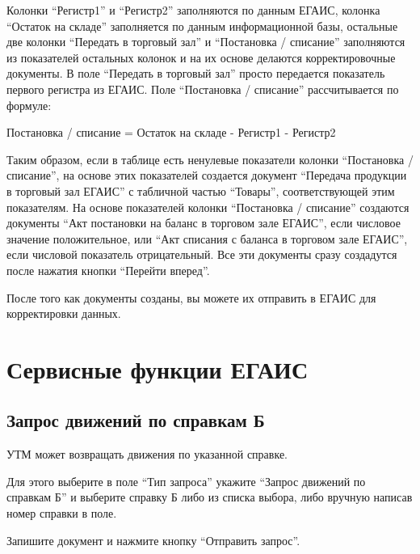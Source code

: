 \documentclass[letterpaper,10pt,russian]{sphinxmanual}
\begin{document}
Колонки ``Регистр1'' и ``Регистр2'' заполняются по данным ЕГАИС, колонка ``Остаток на складе'' заполняется по данным информационной базы, остальные две колонки ``Передать в торговый зал'' и ``Постановка / списание'' заполняются из показателей остальных колонок и на их основе делаются корректировочные документы. В поле ``Передать в торговый зал'' просто передается показатель первого регистра из ЕГАИС. Поле ``Постановка / списание'' рассчитывается по формуле:

Постановка / списание = Остаток на складе - Регистр1 - Регистр2

Таким образом, если в таблице есть ненулевые показатели колонки ``Постановка / списание'', на основе этих показателей создается документ ``Передача продукции в торговый зал ЕГАИС'' с табличной частью ``Товары'', соответствующей этим показателям. На основе показателей колонки ``Постановка / списание'' создаются документы ``Акт постановки на баланс в торговом зале ЕГАИС'', если числовое значение положительное, или ``Акт списания с баланса в торговом зале ЕГАИС'', если числовой показатель отрицательный. Все эти документы сразу создадутся после нажатия кнопки ``Перейти вперед''.
\begin{figure}[htbp]
\centering

\noindent{}
\end{figure}

После того как документы созданы, вы можете их отправить в ЕГАИС для корректировки данных.


\chapter{Сервисные функции ЕГАИС}
\label{servicefunctions::doc}\label{servicefunctions:id1}

\section{Запрос движений по справкам Б}
\label{servicefunctions:id2}
УТМ может возвращать движения по указанной справке.

Для этого выберите в поле ``Тип запроса'' укажите ``Запрос движений по справкам Б'' и выберите справку Б либо из списка выбора, либо вручную написав номер справки в поле.

Запишите документ и нажмите кнопку ``Отправить запрос''.
\begin{figure}[htbp]
\centering

\noindent{}
\end{figure}
\end{document}
